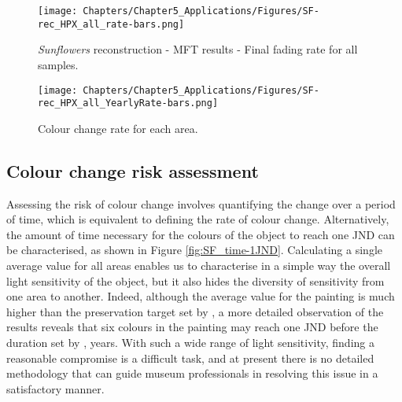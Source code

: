 \begin{figure*}[!h]
\centering
\texttt{[image: Chapters/Chapter5\_Applications/Figures/SF-rec\_HPX\_all\_rate-bars.png]}
\caption[\hspace{0.3cm}\textit{Sunflowers} reconstruction - MFT results - Final fading rates]{\textit{Sunflowers} reconstruction - MFT results - Final fading rate for all samples.}
\label{fig:SF_MFT_fading-rates}
\end{figure*} 


\begin{figure*}[!h]
\centering
\texttt{[image: Chapters/Chapter5\_Applications/Figures/SF-rec\_HPX\_all\_YearlyRate-bars.png]}
\caption[\hspace{0.3cm}\textit{Sunflowers} reconstruction - MFT results, colour change rate]{Colour change rate for each area.}
\label{fig:SF_fading_yearly-rate}
\end{figure*}

\newpage
\subsection{Colour change risk assessment}

Assessing the risk of colour change involves quantifying the change over a period of time, which is equivalent to defining the rate of colour change. Alternatively, the amount of time necessary for the colours of the object to reach one \gls{JND} can be characterised, as shown in Figure \ref{fig:SF_time-1JND}. Calculating a single average value for all areas enables us to characterise in a simple way the overall light sensitivity of the object, but it also hides the diversity of sensitivity from one area to another. Indeed, although the average value for the painting is much higher than the preservation target set by \citet{hendriks_valuing_2017}, a more detailed observation of the results reveals that six colours in the painting may reach one \gls{JND} before the duration set by \citet{hendriks_valuing_2017},  years. With such a wide range of light sensitivity, finding a reasonable compromise is a difficult task, and at present there is no detailed methodology that can guide museum professionals in resolving this issue in a satisfactory manner. \\



